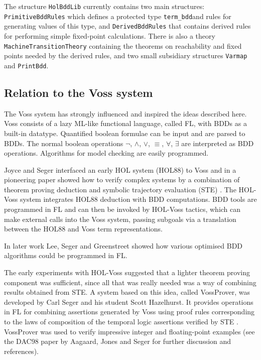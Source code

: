 \documentclass[12pt,fleqn]{article}
\renewcommand{\t}[1]{\mbox{\tt #1}}
\newcommand\termbddty{\texttt{term\_bdd}{}}
\begin{document}
The structure \t{HolBddLib} currently contains two main structures: \t{PrimitiveBddRules}
which defines a protected type \termbddty and rules for generating
values of this type, and \t{DerivedBddRules} that contains derived
rules for performing simple fixed-point calculations.  There is also a
theory \t{MachineTransitionTheory} containing the theorems on
reachability and fixed points needed by the derived rules,
and two small subsidiary structures \t{Varmap} and \t{PrintBdd}.


\subsection{Relation to the Voss system}\label{related}

The Voss system \cite{SegerVoss} has strongly influenced and inspired
the ideas described here. Voss consists of a lazy
ML-like functional language, called FL, with BDDs as a built-in datatype.
Quantified boolean formulae can be input and are parsed to BDDs.
The normal boolean operations $\neg$, $\wedge$, $\vee$, $\equiv$,
$\forall$, $\exists$ are interpreted as BDD operations.  
Algorithms for model checking are easily programmed.

Joyce and Seger interfaced an early HOL system (HOL88) to Voss and in
a pioneering paper showed how to verify complex systems by a
combination of theorem proving deduction and symbolic trajectory
evaluation (STE) \cite{JoyceSeger}. The HOL-Voss system integrates HOL88
deduction with BDD computations.  BDD tools are programmed in FL and
can then be invoked by HOL-Voss tactics, which can make external
calls into the Voss system, passing subgoals via a translation between
the HOL88 and Voss term representations.

In later work Lee, Seger and Greenstreet \cite{LeeGreenstreetSeger}
showed how various optimised BDD algorithms could be programmed in FL.

The early experiments with HOL-Voss suggested that a lighter theorem
proving component was sufficient, since all that was really needed was
a way of combining results obtained from STE. A system based on this
idea, called VossProver, was developed by Carl Seger and his student
Scott Hazelhurst. It provides operations in FL for combining
assertions generated by Voss using proof rules corresponding to the
laws of composition of the temporal logic assertions verified by STE
\cite{hazelhurst-kropfbook-97}.  
VossProver was used to verify
impressive integer and floating-point examples (see the DAC98
paper by Aagaard, Jones and Seger \cite{aagaard-dac-98} for further
discussion and references). 
\end{document}
